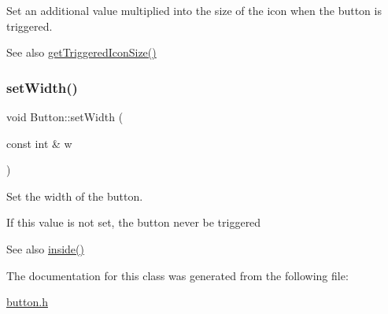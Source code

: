 Set an additional value multiplied into the size of the icon when the button is triggered. 

\begin{DoxySeeAlso}{See also}
\mbox{\hyperlink{class_button_a317bc7f7c5d871d60515aa91a434f645}{get\+Triggered\+Icon\+Size()}} 
\end{DoxySeeAlso}
\mbox{\label{class_button_a0ffdc53b6e8abd2de78cdd2ab40d2d69}} 
\subsubsection{\texorpdfstring{set\+Width()}{setWidth()}}
{\footnotesize\ttfamily void Button\+::set\+Width (\begin{DoxyParamCaption}\item[{const int \&}]{w }\end{DoxyParamCaption})\hspace{0.3cm}{\ttfamily [inline]}}



Set the width of the button. 

If this value is not set, the button never be triggered \begin{DoxySeeAlso}{See also}
\mbox{\hyperlink{class_button_ad7ac1018e71492e734ec0eae2d800d24}{inside()}} 
\end{DoxySeeAlso}


The documentation for this class was generated from the following file\+:\begin{DoxyCompactItemize}
\item 
\mbox{\hyperlink{button_8h}{button.\+h}}\end{DoxyCompactItemize}
